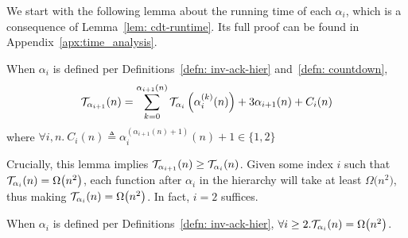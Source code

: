 \noindent We start with the following lemma about the running time of each $\alpha_i$, which is a consequence of Lemma~\ref{lem: cdt-runtime}. Its full proof can be found in Appendix~\ref{apx:time_analysis}.
\begin{lem} \label{lem: inv-ack-hier-runtime}
	When $\alpha_i$ is defined per Definitions~\ref{defn: inv-ack-hier} 
	and~\ref{defn: countdown},
	\begin{equation*}
	\mathcal{T}_{\alpha_{i+1}}(n) = \sum_{k=0}^{\alpha_{i+1}(n)}\mathcal{T}_{\alpha_i}\left( \alpha_i^{(k)}(n)\right) + 3\alpha_{i+1}(n) + C_i(n)
	\end{equation*}
	\hspace{7em}where $\forall i, n.~C_i(n) \triangleq \alpha_i^{(\alpha_{i+1}(n) + 1)}(n) + 1 \in \{1, 2\}$
\end{lem}
Crucially, this lemma implies $\mathcal{T}_{\alpha_{i+1}}(n) \ge 
\mathcal{T}_{\alpha_i}(n)$. 
Given some index $i$ such that \linebreak $\mathcal{T}_{\alpha_i}(n) = \Omega\big(n^2\big)$, each function after $\alpha_i$ in the hierarchy will take at least $\Omega\big(n^2\big)$, thus making $\mathcal{T}_{\alpha_i} (n) = \Omega\big(n^2\big)$.
In fact, $i = 2$ suffices.
\begin{lem} \label{lem: alpha2_runtime_naive}
	When $\alpha_i$ is defined per Definitions~\ref{defn: inv-ack-hier}, $\forall i\ge 2. \mathcal{T}_{\alpha_i}(n) = \Omega\big(n^2\big)$.
\end{lem}


